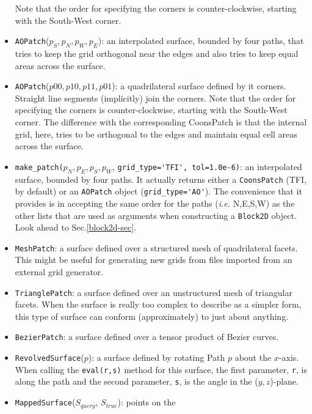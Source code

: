 \begin{itemize}
  Note that the order for specifying the corners is counter-clockwise,
  starting with the South-West corner.
\item \texttt{AOPatch}($p_S, p_N, p_W, p_E$): an interpolated surface, 
  bounded by four paths,
  that tries to keep the grid orthogonal near the edges and 
  also tries to keep equal areas across the surface.
\item \texttt{AOPatch}($p00, p10, p11, p01$): a quadrilateral surface defined by it corners.
  Straight line segments (implicitly) join the corners.
  Note that the order for specifying the corners is counter-clockwise,
  starting with the South-West corner.
  The difference with the corresponding CoonsPatch is that the internal grid, here,
  tries to be orthogonal to the edges and maintain
  equal cell areas across the surface.
\item \verb!make_patch(!$p_N, p_E, p_S, p_W$, \verb!grid_type='TFI', tol=1.0e-6)!: an interpolated surface, 
   bounded by four paths.
  It actually returns either a \verb!CoonsPatch! (TFI, by default) or 
  an \verb!AOPatch! object (\verb!grid_type='AO'!).
  The convenience that it provides is in accepting the same order for the paths (\textit{i.e.} N,E,S,W)
  as the other lists that are used as arguments when constructing a \verb!Block2D! object.
  Look ahead to Sec.\ref{block2d-sec}.
\item \texttt{MeshPatch}: a surface defined over a structured mesh of
  quadrilateral facets.
  This might be useful for generating new grids from files imported from
  an external grid generator.
\item \texttt{TrianglePatch}: a surface defined over an unstructured mesh of
  triangular facets.
  When the surface is really too complex to describe as a simpler form,
  this type of surface can conform (approximately) to just about anything.
\item \texttt{BezierPatch}: a surface defined over a tensor product of Bezier curves. 
\item \texttt{RevolvedSurface}($p$): a surface defined by rotating Path $p$
  about the $x$-axis.
  When calling the \texttt{eval(r,s)} method for this surface, 
  the first parameter, \texttt{r}, is along the path and the second parameter, 
  \texttt{s}, is the angle in the ($y,z$)-plane.
\item \texttt{MappedSurface}($S_{query}$, $S_{true}$): points on the

\end{itemize}
